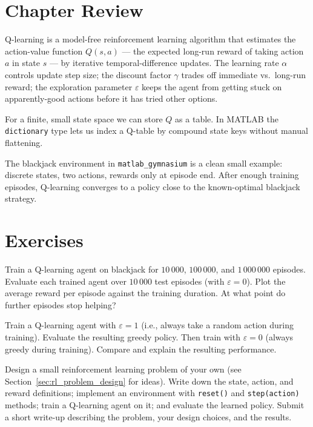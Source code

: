 \documentclass[../../book.tex]{subfiles}
\begin{document}
\section{Chapter Review}

Q-learning is a model-free reinforcement learning algorithm that estimates the action-value function $Q(s, a)$ --- the expected long-run reward of taking action $a$ in state $s$ --- by iterative temporal-difference updates.  The learning rate $\alpha$ controls update step size; the discount factor $\gamma$ trades off immediate vs.\ long-run reward; the exploration parameter $\varepsilon$ keeps the agent from getting stuck on apparently-good actions before it has tried other options.

For a finite, small state space we can store $Q$ as a table.  In MATLAB the \lstinline{dictionary} type lets us index a Q-table by compound state keys without manual flattening.

The blackjack environment in \texttt{matlab\_gymnasium} is a clean small example: discrete states, two actions, rewards only at episode end.  After enough training episodes, Q-learning converges to a policy close to the known-optimal blackjack strategy.

\section{Exercises}

\begin{ex}\label{ex:hyperparams}
Train a Q-learning agent on blackjack for $10\,000$, $100\,000$, and $1\,000\,000$ episodes.  Evaluate each trained agent over $10\,000$ test episodes (with $\varepsilon = 0$).  Plot the average reward per episode against the training duration.  At what point do further episodes stop helping?
\end{ex}

\begin{ex}\label{ex:explore_only}
Train a Q-learning agent with $\varepsilon = 1$ (i.e., always take a random action during training).  Evaluate the resulting greedy policy.  Then train with $\varepsilon = 0$ (always greedy during training).  Compare and explain the resulting performance.
\end{ex}

\begin{ex}\label{ex:rl_problem}
Design a small reinforcement learning problem of your own (see Section~\ref{sec:rl_problem_design} for ideas).  Write down the state, action, and reward definitions; implement an environment with \lstinline{reset()} and \lstinline{step(action)} methods; train a Q-learning agent on it; and evaluate the learned policy.  Submit a short write-up describing the problem, your design choices, and the results.
\end{ex}
\end{document}
